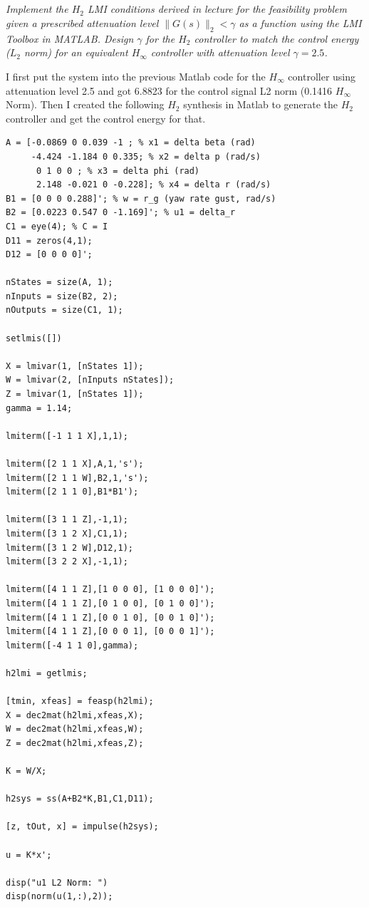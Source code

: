 \documentclass[12pt, letterpaper]{article}
\begin{document}
\subsection{}
\textit{
Implement the $H_2$ LMI conditions derived in lecture for the feasibility problem given a prescribed attenuation level $\|G(s)\|_2 < \gamma$ as a function using the LMI Toolbox in MATLAB. Design $\gamma$ for the $H_2$ controller to match the control energy ($L_2$ norm) for an equivalent $H_\infty$ controller with attenuation level $\gamma = 2.5$.
}

I first put the system into the previous Matlab code for the $H_{\infty}$ controller using attenuation level 2.5 and got 6.8823 for the control signal L2 norm (0.1416 $H_{\infty}$ Norm).
Then I created the following $H_2$ synthesis in Matlab to generate the $H_2$ controller and get the control energy for that.

\begin{lstlisting}[style=matlabstyle]
A = [-0.0869 0 0.039 -1 ; % x1 = delta beta (rad)
     -4.424 -1.184 0 0.335; % x2 = delta p (rad/s)
      0 1 0 0 ; % x3 = delta phi (rad)
      2.148 -0.021 0 -0.228]; % x4 = delta r (rad/s)
B1 = [0 0 0 0.288]'; % w = r_g (yaw rate gust, rad/s)
B2 = [0.0223 0.547 0 -1.169]'; % u1 = delta_r
C1 = eye(4); % C = I
D11 = zeros(4,1);
D12 = [0 0 0 0]';

nStates = size(A, 1);
nInputs = size(B2, 2);
nOutputs = size(C1, 1);

setlmis([])

X = lmivar(1, [nStates 1]);
W = lmivar(2, [nInputs nStates]);
Z = lmivar(1, [nStates 1]);
gamma = 1.14;

lmiterm([-1 1 1 X],1,1);

lmiterm([2 1 1 X],A,1,'s');
lmiterm([2 1 1 W],B2,1,'s');
lmiterm([2 1 1 0],B1*B1');

lmiterm([3 1 1 Z],-1,1); 
lmiterm([3 1 2 X],C1,1);
lmiterm([3 1 2 W],D12,1);
lmiterm([3 2 2 X],-1,1);

lmiterm([4 1 1 Z],[1 0 0 0], [1 0 0 0]');
lmiterm([4 1 1 Z],[0 1 0 0], [0 1 0 0]');
lmiterm([4 1 1 Z],[0 0 1 0], [0 0 1 0]');
lmiterm([4 1 1 Z],[0 0 0 1], [0 0 0 1]');
lmiterm([-4 1 1 0],gamma);

h2lmi = getlmis;

[tmin, xfeas] = feasp(h2lmi);
X = dec2mat(h2lmi,xfeas,X);
W = dec2mat(h2lmi,xfeas,W);
Z = dec2mat(h2lmi,xfeas,Z);

K = W/X;

h2sys = ss(A+B2*K,B1,C1,D11);

[z, tOut, x] = impulse(h2sys);

u = K*x';

disp("u1 L2 Norm: ")
disp(norm(u(1,:),2));    
\end{lstlisting}
\end{document}
